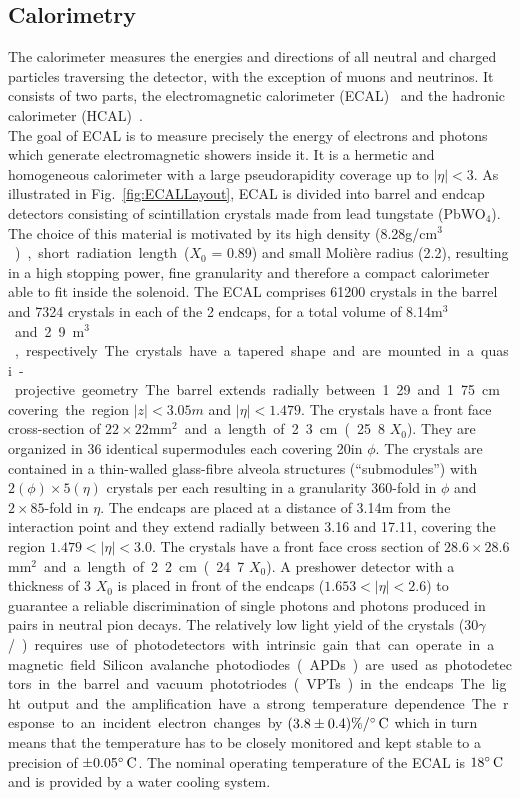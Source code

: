 \subsection{Calorimetry}

The calorimeter measures the energies and directions of all neutral and charged particles traversing the detector, with the exception of muons and neutrinos. It consists of two parts, the
electromagnetic calorimeter (ECAL)~\cite{ECALtdr} and the hadronic calorimeter (HCAL)~\cite{HCALtdr}.\\

The goal of ECAL is to measure precisely the energy of electrons and photons which generate electromagnetic showers inside it. It is a hermetic and homogeneous calorimeter with a large pseudorapidity coverage up to $|\eta| < 3$. As illustrated in Fig.~\ref{fig:ECALLayout}, ECAL is divided into barrel and endcap detectors consisting of scintillation crystals made from lead tungstate (PbWO$_4$). The choice of this material is motivated by its high density (8.28\unit{g/cm$^3$} ), short radiation length ($X_0$ = 0.89\cm) and small Moli\`{e}re radius (2.2\cm), resulting in a high stopping power, fine granularity and therefore a compact calorimeter able to fit inside the solenoid.
The ECAL comprises 61200 crystals in the barrel and 7324 crystals in each of the 2 endcaps, for a total volume of 8.14\unit{m$^3$} and 2.9\unit{m$^3$}, respectively. The crystals have a tapered shape and are mounted in a quasi-projective geometry.
The barrel extends radially between 1.29 and 1.75\cm covering the region $|z| < 3.05\unit{m}$ and $|\eta| < 1.479$. The crystals have a front face cross-section of $22\times22$\unit{mm$^2$} and a length of 2.3\cm (25.8 $X_0$). They are organized in 36 identical supermodules each covering 20\de in $\phi$. The crystals are contained in a thin-walled glass-fibre alveola structures (``submodules'') with $2(\phi)\times5(\eta)$ crystals per each resulting in a granularity 360-fold in $\phi$ and $2\times85$-fold in $\eta$. The endcaps are placed at a distance of 3.14\unit{m} from the interaction point and they extend radially between 3.16 and 17.11\cm, covering the region $1.479 < |\eta| < 3.0$. The crystals have a front face cross section of $28.6\times28.6$\unit{mm$^2$} and a length of 2.2\cm (24.7 $X_0$). A preshower detector with a thickness of 3 $X_0$ is placed in front of the endcaps ($1.653 < |\eta| < 2.6$) to guarantee a reliable discrimination of single photons and photons produced in pairs in neutral pion decays.
The relatively low light yield of the crystals (30\unit{$\gamma$/\MeV}) requires use of photodetectors with intrinsic gain that can operate in a magnetic field. Silicon avalanche photodiodes (APDs) are used as photodetectors in the barrel and vacuum phototriodes (VPTs) in the endcaps. The light output and the amplification have a strong temperature dependence. The response to an incident electron changes by $(3.8\pm0.4)\%/^\circ\text{\,C}$ which in turn means that the temperature has to be closely monitored and kept stable to a precision of $\pm0.05^\circ\text{\,C}$. The nominal operating temperature of the ECAL is $18^\circ\text{\,C}$ and is provided by a water cooling system.

